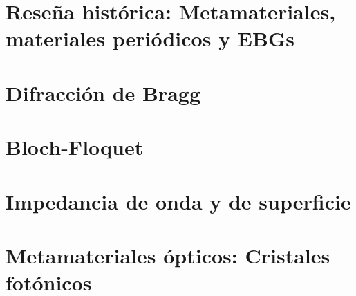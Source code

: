 
\section{Reseña histórica: Metamateriales, materiales periódicos y EBGs}
\label{sec_resenia_metamateriales}
\section{Difracción de Bragg}
\label{sec_bragg}
\section{Bloch-Floquet}
\label{sec_bloch}
\section{Impedancia de onda y de superficie}
\label{sec_imp_superficie}



\section{Metamateriales ópticos: Cristales fotónicos}
\label{sec_cristales_fotonicos}
